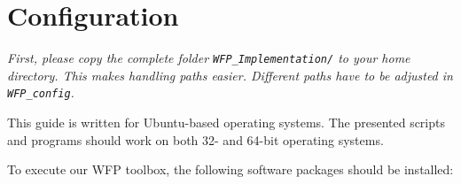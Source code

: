 \chapter{Configuration}
\label{chap:configuration}

\textit{First, please copy the complete folder \texttt{WFP\_Implementation/} to your home directory. This makes handling paths easier. Different paths have to be adjusted in \texttt{WFP\_config}.}

This guide is written for Ubuntu-based operating systems. The presented scripts and programs should work on both 32- and 64-bit operating systems. %

To execute our \ac{WFP} toolbox, the following software packages should be installed:
\vspace{-5mm}
